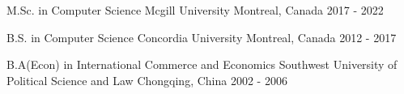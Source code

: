 \documentclass[11pt, a4paper]{awesome-cv} %
\begin{document}
\makecvheader %





\begin{cventries}
	
		\cventry
	{M.Sc. in Computer Science} %
	{Mcgill University} %
	{Montreal, Canada} %
	{2017 -  2022} %
	{ %
	}
	
	\cventry
	{B.S. in Computer Science} %
	{Concordia University} %
	{Montreal, Canada} %
	{2012 - 2017} %
	{ %
	}
	
	

	\cventry
	{B.A(Econ) in International Commerce and Economics} %
	{Southwest University of Political Science and Law} %
	{Chongqing, China} %
	{2002 - 2006 } %
	{
	}
	
	
\end{cventries}


\end{document}
